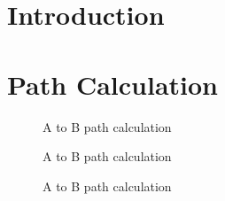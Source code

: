 \section{Introduction}


\section{Path Calculation}


\begin{figure}

\caption{A to B path calculation}
\label{fig:AtoBcircle}
\end{figure}

\begin{figure}

\caption{A to B path calculation}
\label{fig:AtoBcircle}
\end{figure}

\begin{figure}

\caption{A to B path calculation}
\label{fig:AtoBcircle}
\end{figure}